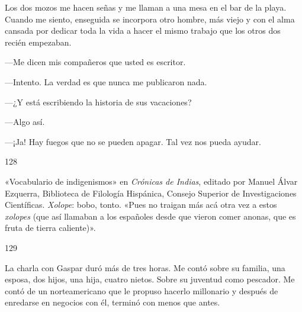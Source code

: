 \documentclass[12pt,twoside,openright,a5paper]{book}
\begin{document}
\nopagebreak

Los dos mozos me hacen señas y me llaman a una mesa en el bar de la
playa. Cuando me siento, enseguida se incorpora otro hombre, más viejo
y con el alma cansada por dedicar toda la vida a hacer el mismo trabajo
que los otros dos recién empezaban.

---Me dicen mis compañeros que usted es escritor.

---Intento. La verdad es que nunca me publicaron nada.

---¿Y está escribiendo la historia de sus vacaciones?

---Algo así.

---¡Ja! Hay fuegos que no se pueden apagar. Tal vez nos pueda ayudar.


\vspace{0.5cm}

\hrulefill \hspace{0.1cm}\decofourleft\hspace{0.2cm} 128 \hspace{0.2cm}\decofourright \hspace{0.1cm}\hrulefill

\nopagebreak

\vspace{0.5cm}

\nopagebreak

«Vocabulario de indigenismos» en \emph{Crónicas de Indias}, editado por Manuel
Álvar Ezquerra, Biblioteca de Filología Hispánica, Consejo Superior de
Investigaciones Científicas. \emph{Xolope}: bobo, tonto. «Pues no traigan más
acá otra vez a estos \emph{xolopes} (que así llamaban a los españoles desde
que vieron comer anonas, que es fruta de tierra caliente)».

\vspace{0.5cm}

\hrulefill \hspace{0.1cm}\decofourleft\hspace{0.2cm} 129 \hspace{0.2cm}\decofourright \hspace{0.1cm}\hrulefill

\nopagebreak

\vspace{0.5cm}

\nopagebreak

La charla con Gaspar duró más de tres horas. Me contó sobre su familia,
una esposa, dos hijos, una hija, cuatro nietos. Sobre su juventud como
pescador. Me contó de un norteamericano que le propuso hacerlo millonario
y después de enredarse en negocios con él, terminó con menos que antes.
\end{document}
